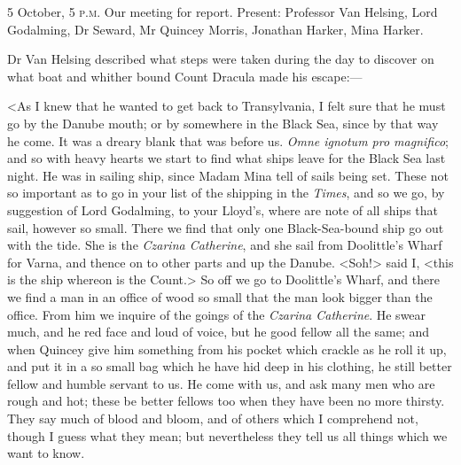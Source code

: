 \begin{diary}{5 October, 5 \textsc{p.m.}}
Our meeting for report. Present: Professor Van Helsing, Lord Godalming, Dr Seward, Mr Quincey Morris, Jonathan Harker, Mina Harker.

Dr Van Helsing described what steps were taken during the day to discover on what boat and whither bound Count Dracula made his escape:—

<As I knew that he wanted to get back to Transylvania, I felt sure that he must go by the Danube mouth; or by somewhere in the Black Sea, since by that way he come. It was a dreary blank that was before us. \textit{Omne ignotum pro magnifico}; and so with heavy hearts we start to find what ships leave for the Black Sea last night. He was in sailing ship, since Madam Mina tell of sails being set. These not so important as to go in your list of the shipping in the \textit{Times}, and so we go, by suggestion of Lord Godalming, to your Lloyd's, where are note of all ships that sail, however so small. There we find that only one Black-Sea-bound ship go out with the tide. She is the \textit{Czarina Catherine}, and she sail from Doolittle's Wharf for Varna, and thence on to other parts and up the Danube. <Soh!> said I, <this is the ship whereon is the Count.> So off we go to Doolittle's Wharf, and there we find a man in an office of wood so small that the man look bigger than the office. From him we inquire of the goings of the \textit{Czarina Catherine}. He swear much, and he red face and loud of voice, but he good fellow all the same; and when Quincey give him something from his pocket which crackle as he roll it up, and put it in a so small bag which he have hid deep in his clothing, he still better fellow and humble servant to us. He come with us, and ask many men who are rough and hot; these be better fellows too when they have been no more thirsty. They say much of blood and bloom, and of others which I comprehend not, though I guess what they mean; but nevertheless they tell us all things which we want to know.


\end{diary}
